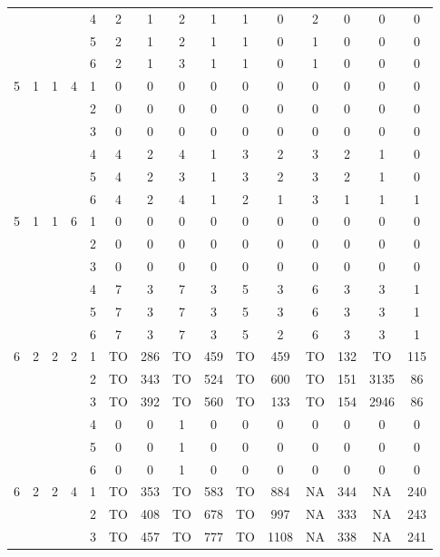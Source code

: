 \begin{longtable}{|c|c|c|c|c|c c|c c|c c|c c|c c|}
 & & & & 4 & 2 & 1 & 2 & 1 & 1 & 0 & 2 & 0 & 0 & 0 \\
 & & & & 5 & 2 & 1 & 2 & 1 & 1 & 0 & 1 & 0 & 0 & 0 \\
 & & & & 6 & 2 & 1 & 3 & 1 & 1 & 0 & 1 & 0 & 0 & 0 \\
\hline
\multirow{6}{*}{5} & \multirow{6}{*}{1} & \multirow{6}{*}{1} & \multirow{6}{*}{4} & 1 & 0 & 0 & 0 & 0 & 0 & 0 & 0 & 0 & 0 & 0 \\
 & & & & 2 & 0 & 0 & 0 & 0 & 0 & 0 & 0 & 0 & 0 & 0 \\
 & & & & 3 & 0 & 0 & 0 & 0 & 0 & 0 & 0 & 0 & 0 & 0 \\
 & & & & 4 & 4 & 2 & 4 & 1 & 3 & 2 & 3 & 2 & 1 & 0 \\
 & & & & 5 & 4 & 2 & 3 & 1 & 3 & 2 & 3 & 2 & 1 & 0 \\
 & & & & 6 & 4 & 2 & 4 & 1 & 2 & 1 & 3 & 1 & 1 & 1 \\
\hline
\multirow{6}{*}{5} & \multirow{6}{*}{1} & \multirow{6}{*}{1} & \multirow{6}{*}{6} & 1 & 0 & 0 & 0 & 0 & 0 & 0 & 0 & 0 & 0 & 0 \\
 & & & & 2 & 0 & 0 & 0 & 0 & 0 & 0 & 0 & 0 & 0 & 0 \\
 & & & & 3 & 0 & 0 & 0 & 0 & 0 & 0 & 0 & 0 & 0 & 0 \\
 & & & & 4 & 7 & 3 & 7 & 3 & 5 & 3 & 6 & 3 & 3 & 1 \\
 & & & & 5 & 7 & 3 & 7 & 3 & 5 & 3 & 6 & 3 & 3 & 1 \\
 & & & & 6 & 7 & 3 & 7 & 3 & 5 & 2 & 6 & 3 & 3 & 1 \\
\hline
\multirow{6}{*}{6} & \multirow{6}{*}{2} & \multirow{6}{*}{2} & \multirow{6}{*}{2} & 1 & TO & 286 & TO & 459 & TO & 459 & TO & 132 & TO & 115 \\
 & & & & 2 & TO & 343 & TO & 524 & TO & 600 & TO & 151 & 3135 & 86 \\
 & & & & 3 & TO & 392 & TO & 560 & TO & 133 & TO & 154 & 2946 & 86 \\
 & & & & 4 & 0 & 0 & 1 & 0 & 0 & 0 & 0 & 0 & 0 & 0 \\
 & & & & 5 & 0 & 0 & 1 & 0 & 0 & 0 & 0 & 0 & 0 & 0 \\
 & & & & 6 & 0 & 0 & 1 & 0 & 0 & 0 & 0 & 0 & 0 & 0 \\
\hline
\multirow{6}{*}{6} & \multirow{6}{*}{2} & \multirow{6}{*}{2} & \multirow{6}{*}{4} & 1 & TO & 353 & TO & 583 & TO & 884 & NA & 344 & NA & 240 \\
 & & & & 2 & TO & 408 & TO & 678 & TO & 997 & NA & 333 & NA & 243 \\
 & & & & 3 & TO & 457 & TO & 777 & TO & 1108 & NA & 338 & NA & 241 \\

\end{longtable}

